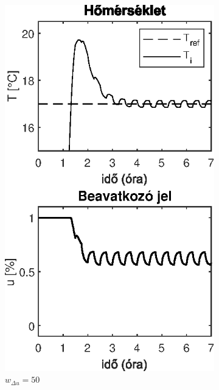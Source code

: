 \begin{figure}[H]
\begin{subfigure}[t]{0.32\textwidth}
	\includegraphics[width=\textwidth]{figures/realsys/mpc-wdu-50}
	\caption{$w_{\Delta u}=50$}
	\label{fig:mpc-wdu-50}
\end{subfigure}
~
\begin{subfigure}[t]{0.32\textwidth}
	\centering

\end{subfigure}
\end{figure}
